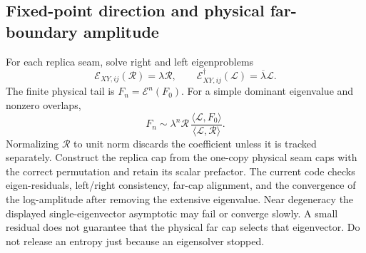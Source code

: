 \documentclass[11pt]{article}
\begin{document}
\subsection{Fixed-point direction and physical far-boundary amplitude}
For each replica seam, solve right and left eigenproblems
\begin{equation}
 \mathcal E_{XY,ij}(\mathcal R)=\lambda\mathcal R,
 \qquad \mathcal E_{XY,ij}^{\dagger}(\mathcal L)
       =\overline\lambda\mathcal L.
\end{equation}
The finite physical tail is $F_n=\mathcal E^n(F_0)$. For a simple dominant
eigenvalue and nonzero overlaps,
\begin{equation}
 F_n\sim\lambda^n\mathcal R\,
 \frac{\langle\mathcal L,F_0\rangle}{\langle\mathcal L,\mathcal R\rangle}.
\end{equation}
Normalizing $\mathcal R$ to unit norm discards the coefficient unless it is
tracked separately. Construct the replica cap from the one-copy physical seam
caps with the correct permutation and retain its scalar prefactor. The current
code checks eigen-residuals, left/right consistency, far-cap alignment, and
the convergence of the log-amplitude after removing the extensive eigenvalue.
Near degeneracy the displayed single-eigenvector asymptotic may fail or converge
slowly. A small residual does not guarantee that the physical far cap selects
that eigenvector. Do not release an entropy just because an eigensolver stopped.
\fi
\end{document}
